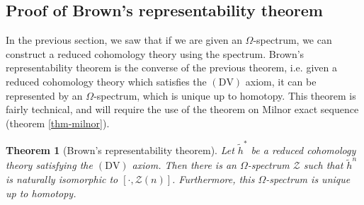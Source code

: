 \documentclass[12pt, notitlepage]{article}
\newtheorem{thm}{Theorem}[section]
\theoremstyle{definition}
\newcommand{\calz}{\mathcal{Z}}
\newcommand{\redco}{\widetilde{h}}
\newcommand{\dv}{\mathrm{DV}}
\begin{document}

\subsection{Proof of Brown's representability theorem}
\label{sec:proof-browns-repr}

In the previous section, we saw that if we are given an $\Omega$-spectrum, we can construct a
reduced cohomology theory using the spectrum. Brown's representability theorem is the converse of
the previous theorem, i.e. given a reduced cohomology theory which satisfies the $(\dv)$ axiom, it
can be represented by an $\Omega$-spectrum, which is unique up to homotopy. This theorem is
fairly technical, and will require the use of the theorem on Milnor exact sequence (theorem
\ref{thm-milnor}).

\begin{thm}[Brown's representability theorem]
  Let $\redco^{\ast}$ be a reduced cohomology theory satisfying the $(\dv)$ axiom. Then there is an
  $\Omega$-spectrum $\calz$ such that $\redco^{n}$ is naturally isomorphic to
  $\left[\cdot, \calz(n) \right]$. Furthermore, this $\Omega$-spectrum is unique up to homotopy.
\end{thm}
\end{document}
